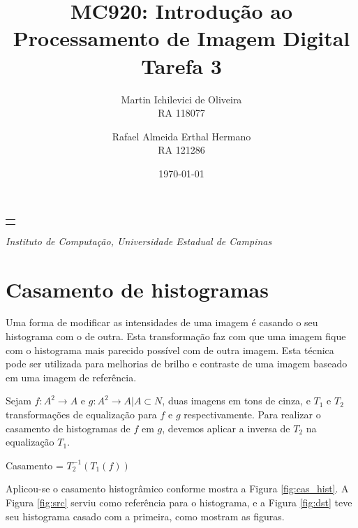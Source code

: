 \documentclass[10pt,a4paper]{article}
\makeatletter
\let\@institution\empty
\def\institution#1{\def\@institution{#1}}
\renewcommand{\maketitle}{
    \begin{center}
        {\Large\bfseries\@title\par\medskip}
        {\large
            \begin{tabular}[t]{c}%
                \@author
        \end{tabular}\par\medskip}
        {\itshape\@institution\par}
        {\itshape\@date\par}
\end{center}}
\makeatother
\begin{document}

\title{MC920: Introdução ao Processamento de Imagem Digital\\Tarefa 3}
\author{
    \begin{minipage}{6cm}
        \centering
        Martin Ichilevici de Oliveira\\
        RA 118077
    \end{minipage}
    \and
    \begin{minipage}{6cm}
        \centering
        Rafael Almeida Erthal Hermano\\
        RA 121286
    \end{minipage}
}
\institution{Instituto de Computação, Universidade Estadual de Campinas}
\date{\today}

\maketitle



\section{Casamento de histogramas}
Uma forma de modificar as intensidades de uma imagem é casando o seu histograma com o de outra. Esta transformação faz com que uma imagem fique com o histograma mais parecido possível com de outra imagem. Esta técnica pode ser utilizada para melhorias de brilho e contraste de uma imagem baseado em uma imagem de referência.

Sejam $f: A^2\rightarrow A$ e $g : A^2 \rightarrow A | A \subset N$, duas imagens em tons de cinza, e $T_1$ e $T_2$ transformações de equalização para $f$ e $g$ respectivamente. Para realizar o casamento de histogramas de $f$ em $g$, devemos aplicar a inversa de $T_2$ na equalização $T_1$.

Casamento = $T_2^{-1}(T_1(f))$

Aplicou-se o casamento histogrâmico conforme mostra a Figura \ref{fig:cas_hist}. A Figura \ref{fig:src} serviu como referência para o histograma, e a Figura \ref{fig:dst} teve seu histograma casado com a primeira, como mostram as figuras.
\end{document}
